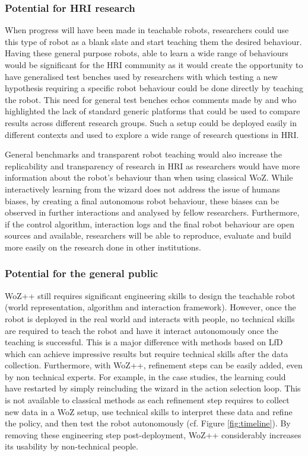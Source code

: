 \documentclass[manuscript, review, anonymous]{acmart}
\newcommand{\woz}{WoZ++\xspace}
\begin{document}
\subsubsection{Potential for HRI research}

When progress will have been made in teachable robots, researchers could use
this type of robot as a blank slate and start teaching them the desired
behaviour. Having these general purpose robots, able to learn a wide range of
behaviours would be significant for the HRI community as it would create the
opportunity to have generalised test benches used by researchers with which
testing a new hypothesis requiring a specific robot behaviour could be done
directly by teaching the robot. This need for general test benches echos
comments made by \cite{baxter2016characterising} and \cite{lemaignan2017free}
who highlighted the lack of standard generic platforms that could be used to
compare results across different research groups. Such a setup could be deployed
easily in different contexts and used to explore a wide range of research
questions in HRI.

General benchmarks and transparent robot teaching would also increase the
replicability and transparency of research in HRI as researchers would have more
information about the robot's behaviour than when using classical WoZ.  While
interactively learning from the wizard does not address the issue of humans
biases, by creating a final autonomous robot behaviour, these biases can be
observed in further interactions and analysed by fellow researchers.
Furthermore, if the control algorithm, interaction logs and the final robot
behaviour are open sources and available, researchers will be able to
reproduce, evaluate and build more easily on the research done in other
institutions.

\subsubsection{Potential for the general public}

\woz still requires significant engineering skills to design the teachable robot
(world representation, algorithm and interaction framework). However, once the
robot is deployed in the real world and interacts with people, no technical
skills are required to teach the robot and have it interact
autonomously once the teaching is successful. This is a major difference with
methods based on LfD \cite{knox2014learning,sequeira2016discovering} which can
achieve impressive results but require technical skills after the data
collection. Furthermore, with \woz, refinement steps can be easily added, even by
non technical experts. For
example, in the case studies, the learning could have restarted by simply
reincluding the wizard in the action selection loop. This is not available to
classical methods as each refinement step requires to collect new data in a WoZ
setup, use technical skills to interpret these data and refine the policy, and
then test the robot autonomously (cf. Figure \ref{fig:timeline}). By removing these engineering step
post-deployment, \woz considerably increases its usability by non-technical
people.
\end{document}
